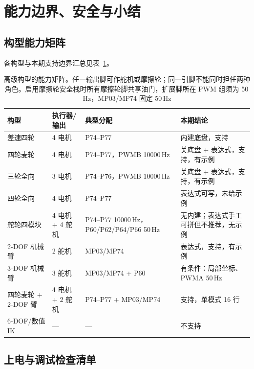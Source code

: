 \section{能力边界、安全与小结}

\subsection{构型能力矩阵}

各构型与本期支持边界汇总见表~\ref{tab:ch05-capability}。

\begin{table}[htbp]
  \centering
  \small
  \begin{tabularx}{\linewidth}{@{}l l l >{\raggedright\arraybackslash}X@{}}
    \toprule
    构型 & 执行器/输出 & 典型分配 & 本期结论 \\
    \midrule
    差速四轮 & 4 电机 & P74--P77 & 内建底盘，支持 \\
    四轮麦轮 & 4 电机 & P74--P77，PWMB 10000\,Hz & 关底盘 + 表达式，支持，有示例 \\
    三轮全向 & 3 电机 & P74--P76，PWMB 10000\,Hz & 关底盘 + 表达式，支持，有示例 \\
    四轮全向 & 4 电机 & P74--P77 & 表达式可写，未给示例 \\
    舵轮四模块 & 4 电机 + 4 舵机 & P74--P77 10000\,Hz，P60/P62/P64/P66 50\,Hz & 无内建；表达式手工可拼但不推荐，无示例 \\
    2-DOF 机械臂 & 2 舵机 & MP03/MP74 & 表达式，支持，有示例 \\
    3-DOF 机械臂 & 3 舵机 & MP03/MP74 + P60 & 有条件：局部坐标、PWMA 50\,Hz \\
    四轮麦轮 + 2-DOF 臂 & 4 电机 + 2 舵机 & P74--P77 + MP03/MP74 & 支持，单模式 16 行 \\
    6-DOF/数值 IK & — & — & 不支持 \\
    \bottomrule
  \end{tabularx}
  \caption{高级构型的能力矩阵。任一输出脚可作舵机或摩擦轮；同一引脚不能同时担任两种角色。启用摩擦轮安全栈时所有摩擦轮脚共享油门，扩展脚所在 PWM 组须为 50\,Hz，MP03/MP74 固定 50\,Hz}
  \label{tab:ch05-capability}
\end{table}

\subsection{上电与调试检查清单}

